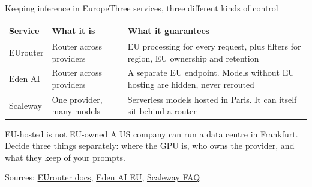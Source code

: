 \documentclass[aspectratio=169]{beamer}
\newcommand{\srcmulti}[1]{\par\vfill{\fontsize{7}{8}\selectfont\color{ACINgray}Sources: #1}}
\begin{document}
\begin{frame}{Keeping inference in Europe}{Three services, three different kinds of control}
\footnotesize
\renewcommand{\arraystretch}{1.25}
\begin{tabular}{@{}P{2.0cm}P{3.4cm}P{7.0cm}@{}}
\toprule
\textbf{Service} & \textbf{What it is} & \textbf{What it guarantees} \\
\midrule
EUrouter & Router across providers & EU processing for every request, plus filters for region, EU ownership and retention \\
Eden AI & Router across providers & A separate EU endpoint. Models without EU hosting are hidden, never rerouted \\
Scaleway & One provider, many models & Serverless models hosted in Paris. It can itself sit behind a router \\
\bottomrule
\end{tabular}
\vspace{2mm}
\begin{block}{EU-hosted is not EU-owned}
A US company can run a data centre in Frankfurt. Decide three things separately: where the GPU is, who owns the provider, and what they keep of your prompts.
\end{block}
\srcmulti{\href{https://www.eurouter.ai/docs}{EUrouter docs}, \href{https://www.edenai.co/eu}{Eden AI EU}, \href{https://www.scaleway.com/en/docs/generative-apis/faq/}{Scaleway FAQ}}
\end{frame}
\end{document}
